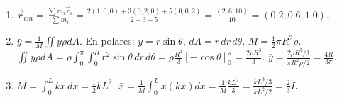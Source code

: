 \begin{sol}
\begin{enumerate}
    \item $\vec{r}_{cm} = \frac{\sum m_i \vec{r}_i}{\sum m_i} = \frac{2(1,0,0) + 3(0,2,0) + 5(0,0,2)}{2+3+5} = \frac{(2, 6, 10)}{10} = (0.2, 0.6, 1.0)$.
    \item $\bar{y} = \frac{1}{M} \iint y \rho dA$. En polares: $y = r\sin\theta$, $dA = r \, dr \, d\theta$.
    $M = \frac{1}{2}\pi R^2 \rho$. 
    $\iint y \rho dA = \rho \int_0^\pi \int_0^R r^2 \sin\theta \, dr \, d\theta = \rho \frac{R^3}{3} [-\cos\theta]_0^\pi = \frac{2\rho R^3}{3}$.
    $\bar{y} = \frac{2\rho R^3 / 3}{\pi R^2 \rho / 2} = \frac{4R}{3\pi}$.
    \item $M = \int_0^L kx \, dx = \frac{1}{2}kL^2$. 
    $\bar{x} = \frac{1}{M} \int_0^L x (kx) dx = \frac{1}{M} \frac{kL^3}{3} = \frac{kL^3/3}{kL^2/2} = \frac{2}{3}L$.
\end{enumerate}
\end{sol}